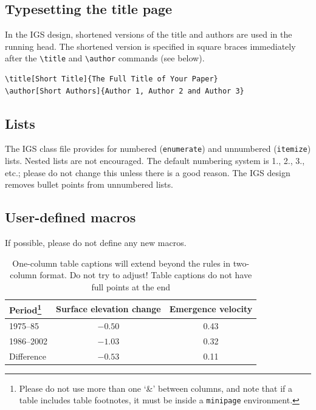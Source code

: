 \documentclass[review,aog]{igs}
\begin{document}
\subsection{Typesetting the title page}

In the IGS design, shortened versions of the title and authors are used in the running head. The shortened version is specified in square braces immediately after the \verb"\title" and \verb"\author" commands (see below). 

\begin{verbatim}
\title[Short Title]{The Full Title of Your Paper}
\author[Short Authors]{Author 1, Author 2 and Author 3}
\end{verbatim}

\subsection{Lists}
The IGS class file provides for numbered (\verb"enumerate") and unnumbered (\verb"itemize") lists. Nested lists are not encouraged. The default numbering system is 1., 2., 3., etc.; please do not change this unless there is a good reason. The IGS design removes bullet points from unnumbered lists.

\subsection{User-defined macros}
If possible, please do not define any new macros.

\begin{table}%
\caption{One-column table captions will extend beyond
  the rules in two-column format. Do not try to adjust!
  Table captions do not have full points at the end}
\label{period}
\begin{minipage}{86mm}%
\begin{tabular}{@{}lcc}\hline
Period\footnote{Please do not use more than one `\&' 
  between columns, and note that if a table includes 
  table footnotes, it must be inside a \texttt{minipage} 
  environment.}%
  & Surface elevation change
  & Emergence velocity\\ \hline
1975--85   & $-0.50$ & 0.43\\
1986--2002 & $-1.03$ & 0.32\\
Difference & $-0.53$ & \llap{$-$}0.11
\end{tabular}
\end{minipage}%
\end{table}
\end{document}
